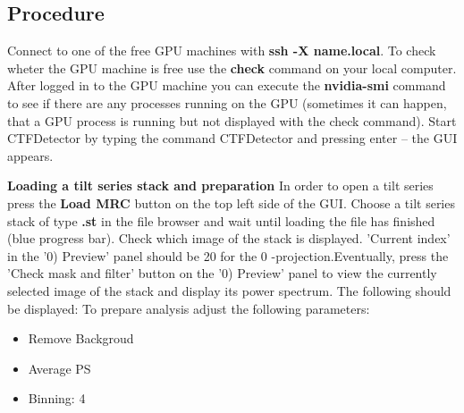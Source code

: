 \documentclass[12pt,a4paper]{scrartcl}
\begin{document}
\subsection{Procedure}
Connect to one of the free GPU machines with \textbf{ssh -X name.local}. To check wheter the GPU machine is free use the \textbf{check} command on your local computer. After logged in to the GPU machine you can execute the \textbf{nvidia-smi} command to see if there are any processes running on the GPU (sometimes it can happen, that a GPU process is running but not displayed with the check command). 
Start CTFDetector by typing the command CTFDetector and pressing enter – the GUI appears.
\vspace{1em}

\textbf{Loading a tilt series stack and preparation}
\vspace{1em}
\newline In order to open a tilt series press the \textbf{Load MRC} button on the top left side of the GUI. Choose a tilt series stack of type \textbf{.st} in the file browser and wait until loading the file has finished (blue progress bar).
Check which image of the stack is displayed. ’Current index’ in the ’0) Preview’ panel should be 20 for the 0 -projection.Eventually, press the ’Check mask and filter’ button on the ’0) Preview’ panel to view the currently selected image of the stack and display its power spectrum. The following should be displayed:
To prepare analysis adjust the following parameters:

\begin{itemize}
\item Remove Backgroud
\item Average PS
\item Binning: 4
\end{itemize}
\end{document}

